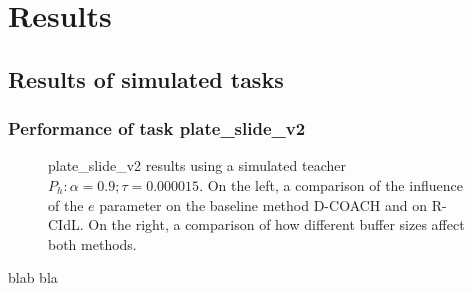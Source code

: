 \chapter{Results}
\label{chapter:Results}

\section{Results of simulated tasks}
\label{section:results_metaworld}
\subsection{Performance of task plate\_slide\_v2}
\label{subsection:Performance of task plate_slide_v2}

 \begin{figure}[htpb]
  \centering
   \hfill
  \caption{plate\_slide\_v2 results using a simulated teacher $P_h: \alpha = 0.9; \tau =  0.000015$. On the left, a comparison of the influence of the $e$ parameter on the baseline method D-COACH and on R-CIdL. On the right, a comparison of how different buffer sizes affect both methods.}
  \label{fig:results_plate_slide_buffer_e}
\end{figure}


      
blab bla



